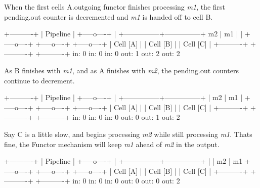When the first cell\textquotesingle{}s {\ttfamily A.\+outgoing} functor finishes processing {\itshape m1}, the first {\ttfamily pending.\+out} counter is decremented and {\itshape m1} is handed off to cell {\ttfamily B}.

\begin{DoxyVerb}                          +----------+
                          | Pipeline |
                          +-----o----+
                                |
                +---------------+---------------+
            m2  |           m1  |               |
          +-----o----+    +-----o----+    +-----o----+
          | Cell [A] |    | Cell [B] |    | Cell [C] |
          +----------+    +----------+    +----------+
             in: 0           in: 0           in: 0
            out: 1          out: 2          out: 2
\end{DoxyVerb}


As {\ttfamily B} finishes with {\itshape m1}, and as {\ttfamily A} finishes with {\itshape m2}, the {\ttfamily pending.\+out} counters continue to decrement.

\begin{DoxyVerb}                          +----------+
                          | Pipeline |
                          +-----o----+
                                |
                +---------------+---------------+
                |           m2  |           m1  |
          +-----o----+    +-----o----+    +-----o----+
          | Cell [A] |    | Cell [B] |    | Cell [C] |
          +----------+    +----------+    +----------+
             in: 0           in: 0           in: 0
            out: 0          out: 1          out: 2
\end{DoxyVerb}


Say {\ttfamily C} is a little slow, and begins processing {\itshape m2} while still processing {\itshape m1}. That\textquotesingle{}s fine, the {\ttfamily Functor} mechanism will keep {\itshape m1} ahead of {\itshape m2} in the output.

\begin{DoxyVerb}                          +----------+
                          | Pipeline |
                          +-----o----+
                                |
                +---------------+---------------+
                |               |           m2  | m1
          +-----o----+    +-----o----+    +-----o----+
          | Cell [A] |    | Cell [B] |    | Cell [C] |
          +----------+    +----------+    +----------+
             in: 0           in: 0           in: 0
            out: 0          out: 0          out: 2
\end{DoxyVerb}


